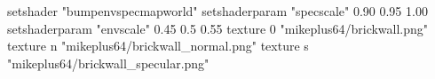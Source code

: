 setshader "bumpenvspecmapworld"
setshaderparam "specscale" 0.90 0.95 1.00
setshaderparam "envscale"  0.45 0.5 0.55
   texture 0 "mikeplus64/brickwall.png"
   texture n "mikeplus64/brickwall_normal.png"
   texture s "mikeplus64/brickwall_specular.png"
